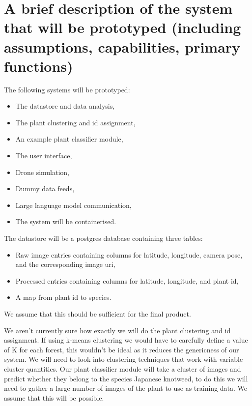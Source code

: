 \documentclass{article}
\begin{document}
\section{A brief description of the system that will be prototyped (including assumptions, capabilities, primary functions)}


The following systems will be prototyped:
\begin{itemize}[noitemsep,topsep=3pt]
\item The datastore and data analysis,
\item The plant clustering and id assignment,
\item An example plant classifier module,
\item The user interface,
\item Drone simulation,
\item Dummy data feeds,
\item Large language model communication,
\item The system will be containerised.
\end{itemize}

\noindent
The datastore will be a postgres database containing three tables:
\begin{itemize}[noitemsep,topsep=3pt]
\item Raw image entries containing columns for latitude, longitude, camera pose, and the corresponding image uri,
\item Processed entries containing columns for latitude, longitude, and plant id,
\item A map from plant id to species.
\end{itemize}
We assume that this should be sufficient for the final product.

We aren't currently sure how exactly we will do the plant clustering and id assignment.
If using k-means clustering we would have to carefully define a value of K for each forest, this wouldn't be ideal as it reduces the genericness of our system.
We will need to look into clustering techniques that work with variable cluster quantities.
Our plant classifier module will take a cluster of images and predict whether they belong to the species Japanese knotweed, to do this we will need to gather a large number of images of the plant to use as training data. We assume that this will be possible. %
\end{document}
